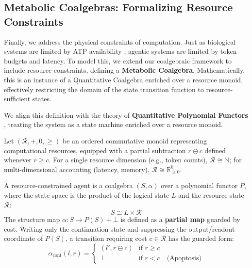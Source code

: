 \subsection{Metabolic Coalgebras: Formalizing Resource Constraints}

Finally, we address the physical constraints of computation. Just as biological systems are limited by ATP availability \cite{lynch2015bioenergetic,kempes2017thermodynamic}, agentic systems are limited by token budgets and latency. To model this, we extend our coalgebraic framework to include resource constraints, defining a \textbf{Metabolic Coalgebra}. Mathematically, this is an instance of a Quantitative Coalgebra enriched over a resource monoid, effectively restricting the domain of the state transition function to resource-sufficient states.

We align this definition with the theory of \textbf{Quantitative Polynomial Functors} \cite{nakov2021quantitative}, treating the system as a state machine enriched over a resource monoid.

\begin{definition}\label{def:resource-monoid}
Let $(\mathcal{R}, +, 0, \ge)$ be an ordered commutative monoid representing computational resources, equipped with a partial subtraction $r \ominus c$ defined whenever $r \ge c$. For a single resource dimension (e.g., token counts), $\mathcal{R} \cong \mathbb{N}$; for multi-dimensional accounting (latency, memory), $\mathcal{R} \cong \mathbb{R}_{\ge 0}^k$.
\end{definition}

\begin{definition}\label{def:metabolic-coalgebra}
A resource-constrained agent is a coalgebra $(S, \alpha)$ over a polynomial functor $P$, where the state space is the product of the logical state $L$ and the resource state $\mathcal{R}$:
\begin{equation*}
    S \cong L \times \mathcal{R}
\end{equation*}
The structure map $\alpha: S \to P(S) + \bot$ is defined as a \textbf{partial map} guarded by cost. Writing only the continuation state and suppressing the output/readout coordinate of $P(S)$, a transition requiring cost $c \in \mathcal{R}$ has the guarded form:
\begin{equation*}
    \alpha_{\mathrm{cont}}(l, r) =
    \begin{cases}
      (l', r \ominus c) & \text{if } r \ge c \\
      \bot & \text{if } r < c \quad \text{(Apoptosis)}
    \end{cases}
\end{equation*}
\end{definition}

